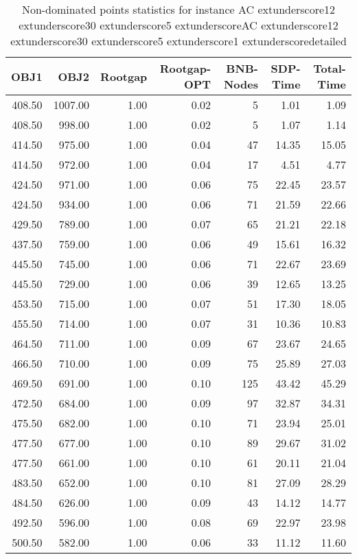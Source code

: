 \begin{table}
\caption{Non-dominated points statistics for instance AC	extunderscore12	extunderscore30	extunderscore5	extunderscoreAC	extunderscore12	extunderscore30	extunderscore5	extunderscore1	extunderscoredetailed}
\label{tab:stats/AC_12_30_5_AC_12_30_5_1_detailed}
\begin{tabular}{rrrrrrr}
\toprule
OBJ1 & OBJ2 & Rootgap & Rootgap-OPT & BNB-Nodes & SDP-Time & Total-Time \\
\midrule
408.50 & 1007.00 & 1.00 & 0.02 & 5 & 1.01 & 1.09 \\
408.50 & 998.00 & 1.00 & 0.02 & 5 & 1.07 & 1.14 \\
414.50 & 975.00 & 1.00 & 0.04 & 47 & 14.35 & 15.05 \\
414.50 & 972.00 & 1.00 & 0.04 & 17 & 4.51 & 4.77 \\
424.50 & 971.00 & 1.00 & 0.06 & 75 & 22.45 & 23.57 \\
424.50 & 934.00 & 1.00 & 0.06 & 71 & 21.59 & 22.66 \\
429.50 & 789.00 & 1.00 & 0.07 & 65 & 21.21 & 22.18 \\
437.50 & 759.00 & 1.00 & 0.06 & 49 & 15.61 & 16.32 \\
445.50 & 745.00 & 1.00 & 0.06 & 71 & 22.67 & 23.69 \\
445.50 & 729.00 & 1.00 & 0.06 & 39 & 12.65 & 13.25 \\
453.50 & 715.00 & 1.00 & 0.07 & 51 & 17.30 & 18.05 \\
455.50 & 714.00 & 1.00 & 0.07 & 31 & 10.36 & 10.83 \\
464.50 & 711.00 & 1.00 & 0.09 & 67 & 23.67 & 24.65 \\
466.50 & 710.00 & 1.00 & 0.09 & 75 & 25.89 & 27.03 \\
469.50 & 691.00 & 1.00 & 0.10 & 125 & 43.42 & 45.29 \\
472.50 & 684.00 & 1.00 & 0.09 & 97 & 32.87 & 34.31 \\
475.50 & 682.00 & 1.00 & 0.10 & 71 & 23.94 & 25.01 \\
477.50 & 677.00 & 1.00 & 0.10 & 89 & 29.67 & 31.02 \\
477.50 & 661.00 & 1.00 & 0.10 & 61 & 20.11 & 21.04 \\
483.50 & 652.00 & 1.00 & 0.10 & 81 & 27.09 & 28.29 \\
484.50 & 626.00 & 1.00 & 0.09 & 43 & 14.12 & 14.77 \\
492.50 & 596.00 & 1.00 & 0.08 & 69 & 22.97 & 23.98 \\
500.50 & 582.00 & 1.00 & 0.06 & 33 & 11.12 & 11.60 \\

\end{tabular}
\end{table}

